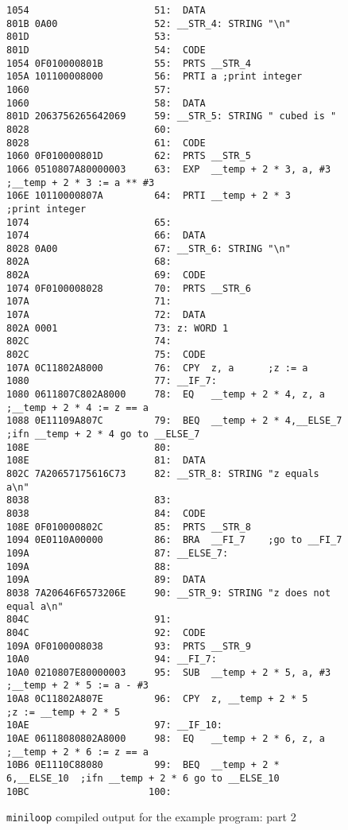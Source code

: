 \begin{figure}
\hspace*{-1cm}
\begin{minipage}{30cm}
\footnotesize
\begin{verbatim}
1054                      51:  DATA
801B 0A00                 52: __STR_4: STRING "\n"
801D                      53: 
801D                      54:  CODE
1054 0F010000801B         55:  PRTS __STR_4
105A 101100008000         56:  PRTI a ;print integer
1060                      57: 
1060                      58:  DATA
801D 2063756265642069     59: __STR_5: STRING " cubed is "
8028                      60: 
8028                      61:  CODE
1060 0F010000801D         62:  PRTS __STR_5
1066 0510807A80000003     63:  EXP  __temp + 2 * 3, a, #3     ;__temp + 2 * 3 := a ** #3
106E 10110000807A         64:  PRTI __temp + 2 * 3    ;print integer
1074                      65: 
1074                      66:  DATA
8028 0A00                 67: __STR_6: STRING "\n"
802A                      68: 
802A                      69:  CODE
1074 0F0100008028         70:  PRTS __STR_6
107A                      71:  
107A                      72:  DATA
802A 0001                 73: z: WORD 1
802C                      74: 
802C                      75:  CODE
107A 0C11802A8000         76:  CPY  z, a      ;z := a 
1080                      77: __IF_7:
1080 0611807C802A8000     78:  EQ   __temp + 2 * 4, z, a      ;__temp + 2 * 4 := z == a
1088 0E11109A807C         79:  BEQ  __temp + 2 * 4,__ELSE_7   ;ifn __temp + 2 * 4 go to __ELSE_7 
108E                      80: 
108E                      81:  DATA
802C 7A20657175616C73     82: __STR_8: STRING "z equals a\n"
8038                      83: 
8038                      84:  CODE
108E 0F010000802C         85:  PRTS __STR_8
1094 0E0110A00000         86:  BRA  __FI_7    ;go to __FI_7
109A                      87: __ELSE_7:
109A                      88: 
109A                      89:  DATA
8038 7A20646F6573206E     90: __STR_9: STRING "z does not equal a\n"
804C                      91: 
804C                      92:  CODE
109A 0F0100008038         93:  PRTS __STR_9
10A0                      94: __FI_7:
10A0 0210807E80000003     95:  SUB  __temp + 2 * 5, a, #3     ;__temp + 2 * 5 := a - #3
10A8 0C11802A807E         96:  CPY  z, __temp + 2 * 5         ;z := __temp + 2 * 5 
10AE                      97: __IF_10:
10AE 06118080802A8000     98:  EQ   __temp + 2 * 6, z, a      ;__temp + 2 * 6 := z == a
10B6 0E1110C88080         99:  BEQ  __temp + 2 * 6,__ELSE_10  ;ifn __temp + 2 * 6 go to __ELSE_10 
10BC                     100: 
\end{verbatim}
\end{minipage}
\caption{{\tt miniloop} compiled output for the example program: part 2}
\label{miniloop:assembler2}
\end{figure}
